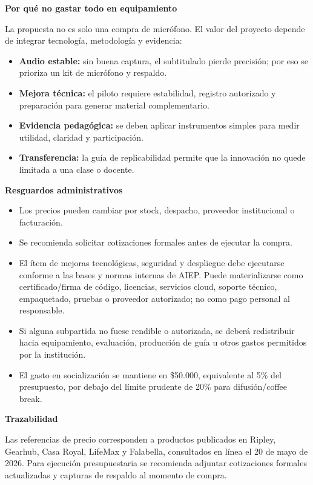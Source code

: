 \documentclass[10pt,letterpaper]{article}
\newcommand{\sectiontitle}[1]{%
  \vspace{0.55em}%
  {\bfseries\large #1}\par
  \vspace{0.12em}%
}
\newcommand{\money}[1]{\$#1}
\begin{document}
\sectiontitle{Por qué no gastar todo en equipamiento}

La propuesta no es solo una compra de micrófono. El valor del proyecto depende de integrar tecnología, metodología y evidencia:

\begin{itemize}
  \item \textbf{Audio estable:} sin buena captura, el subtitulado pierde precisión; por eso se prioriza un kit de micrófono y respaldo.
  \item \textbf{Mejora técnica:} el piloto requiere estabilidad, registro autorizado y preparación para generar material complementario.
  \item \textbf{Evidencia pedagógica:} se deben aplicar instrumentos simples para medir utilidad, claridad y participación.
  \item \textbf{Transferencia:} la guía de replicabilidad permite que la innovación no quede limitada a una clase o docente.
\end{itemize}

\sectiontitle{Resguardos administrativos}

\begin{itemize}
  \item Los precios pueden cambiar por stock, despacho, proveedor institucional o facturación.
  \item Se recomienda solicitar cotizaciones formales antes de ejecutar la compra.
  \item El ítem de mejoras tecnológicas, seguridad y despliegue debe ejecutarse conforme a las bases y normas internas de AIEP. Puede materializarse como certificado/firma de código, licencias, servicios cloud, soporte técnico, empaquetado, pruebas o proveedor autorizado; no como pago personal al responsable.
  \item Si alguna subpartida no fuese rendible o autorizada, se deberá redistribuir hacia equipamiento, evaluación, producción de guía u otros gastos permitidos por la institución.
  \item El gasto en socialización se mantiene en \money{50.000}, equivalente al 5\% del presupuesto, por debajo del límite prudente de 20\% para difusión/coffee break.
\end{itemize}

\sectiontitle{Trazabilidad}

Las referencias de precio corresponden a productos publicados en Ripley, Gearhub, Casa Royal, LifeMax y Falabella, consultados en línea el 20 de mayo de 2026. Para ejecución presupuestaria se recomienda adjuntar cotizaciones formales actualizadas y capturas de respaldo al momento de compra.
\end{document}
